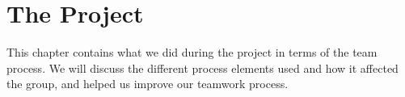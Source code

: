 \chapter{The Project}
This chapter contains what we did during the project in terms of the team process. We will discuss the different process elements used and how it affected the group, and helped us improve our teamwork process.

